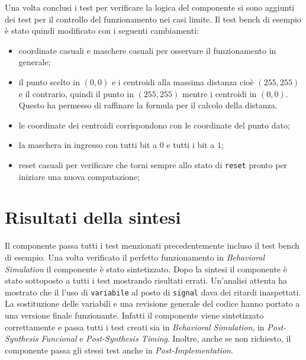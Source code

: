 \documentclass{article}
\begin{document}
	Una volta conclusi i test per verificare la logica del componente si sono aggiunti dei test per il controllo del funzionamento nei casi limite. Il test bench di esempio \`{e} stato quindi modificato con i seguenti cambiamenti:
	\begin{itemize}
		\item coordinate casuali e maschere casuali per osservare il funzionamento in generale;
		\item il punto scelto in $(0,0)$ e i centroidi alla massima distanza cio\`{e} $(255,255)$ e il contrario, quindi il punto in $(255,255)$ mentre i centroidi in $(0,0)$. Questo ha permesso di raffinare la formula per il calcolo della distanza.
		\item le coordinate dei centroidi corrispondono con le coordinate del punto dato;
		\item la maschera in ingresso con tutti bit a $0$ e tutti i bit a $1$;
		\item reset casuali per verificare che torni sempre allo stato di \texttt{reset} pronto per iniziare una nuova computazione;	
	\end{itemize}
	
	
	
	
	\section{Risultati della sintesi}
	Il componente passa tutti i test menzionati precedentemente incluso il test bench di esempio. Una volta verificato il perfetto funzionamento in \textit{Behavioral Simulation} il componente \`{e} stato sintetizzato. Dopo la sintesi il componente \`{e} stato sottoposto a tutti i test mostrando risultati errati.\medskip
	\newline
	Un'analisi attenta ha mostrato che il l'uso di \texttt{variabile} al posto di \texttt{signal} dava dei ritardi inaspettati. La sostituzione delle variabili e una revisione generale del codice hanno portato a una versione finale funzionante. Infatti il componente viene sintetizzato correttamente e passa tutti i test creati sia in \textit{Behavioral Simulation}, in \textit{Post-Synthesis Funcional} e \textit{Post-Synthesis Timing}. Inoltre, anche se non richiesto, il componente passa gli stessi test anche in \textit{Post-Implementation}.
	
\end{document}

